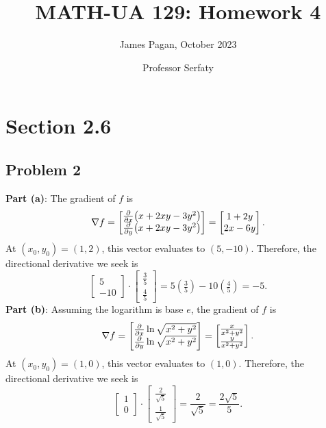 \documentclass[11pt]{article}
\title{MATH-UA 129: Homework 4}
\author{James Pagan, October 2023}
\date{Professor Serfaty}
\renewcommand{\grad}{\nabla}
\begin{document}
\maketitle
\tableofcontents


\section{Section 2.6}


\subsection{Problem 2}

\textbf{Part (a)}: The gradient of $f$ is
\[
	\grad f = \begin{bmatrix} \pdv{x} (x + 2xy - 3y^{2}) \\ \pdv{y} (x + 2xy - 3y^{2}) \end{bmatrix} = \begin{bmatrix} 1 + 2y \\ 2x - 6y \end{bmatrix}.
\]
At $(x_{0}, y_{0}) = (1, 2)$, this vector evaluates to $(5, -10)$. Therefore, the directional derivative we seek is
\[
	\begin{bmatrix} 5 \\ -10 \end{bmatrix} \cdot \begin{bmatrix} \tfrac{3}{5} \\ \tfrac{4}{5} \end{bmatrix} = 5 \left( \tfrac{3}{5} \right) - 10 \left( \tfrac{4}{5} \right) = \boxed{-5}.
\]
\textbf{Part (b)}: Assuming the logarithm is base $e$, the gradient of $f$ is
\[
	\grad f = \begin{bmatrix} \pdv{x} \ln \sqrt{x^{2} + y^{2}} \\ \pdv{y} \ln \sqrt{x^{2} + y^{2}} \end{bmatrix} = \begin{bmatrix} \frac{x}{x^{2} + y^{2}} \\ \frac{y}{x^{2} + y^{2}} \end{bmatrix}.
\]
At $(x_{0}, y_{0}) = (1, 0)$, this vector evaluates to $(1, 0)$. Therefore, the directional derivative we seek is
\[
	\begin{bmatrix} 1 \\ 0 \end{bmatrix} \cdot \begin{bmatrix} \tfrac{2}{\sqrt{5}} \\ \tfrac{1}{\sqrt{5}} \end{bmatrix} = \frac{2}{\sqrt{5}} = \boxed{\frac{2 \sqrt{5}}{5}}.
\]
\end{document}
